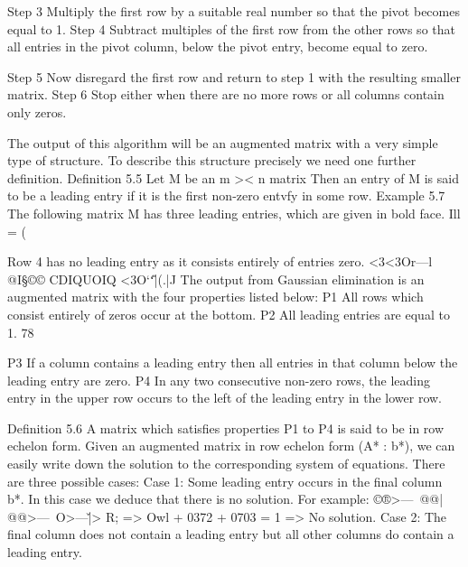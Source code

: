 \documentclass{beamer}
\begin{document}
\begin{frame}
Step 3 Multiply the ﬁrst row by a suitable real number so that
the pivot becomes equal to 1.
Step 4 Subtract multiples of the ﬁrst row from the other rows so
that all entries in the pivot column, below the pivot entry,
become equal to zero.

\end{frame}
\begin{frame}
Step 5 Now disregard the ﬁrst row and return to step 1 with the
resulting smaller matrix.
Step 6 Stop either when there are no more rows or all columns
contain only zeros.

\end{frame}
\begin{frame}
The output of this algorithm will be an augmented matrix with a
very simple type of structure. To describe this structure precisely we
need one further deﬁnition.
Definition 5.5 Let M be an m >< n matrix Then an entry of M is said to
be a leading entry if it is the first non-zero entvfy in some row.
Example 5.7 The following matrix M has three leading entries, which
are given in bold face.
Ill = (

\end{frame}
\begin{frame}
Row 4 has no leading entry as it consists entirely of entries zero.
<3<3Or—l
@I§©©
CDIQUOIQ
<3O‘\U‘|(.|J
The output from Gaussian elimination is an augmented matrix with
the four properties listed below:
P1 All rows which consist entirely of zeros occur at the bottom.
P2 All leading entries are equal to 1.
78



P3 If a column contains a leading entry then all entries in that
column below the leading entry are zero.
P4 In any two consecutive non-zero rows, the leading entry in the
upper row occurs to the left of the leading entry in the lower
row.

\end{frame}
\begin{frame}
Definition 5.6 A matrix which satisﬁes properties P1 to P4 is said to be
in row echelon form.
Given an augmented matrix in row echelon form (A* : b*), we can
easily write down the solution to the corresponding system of
equations. There are three possible cases:
Case 1: Some leading entry occurs in the final column b*.
In this case we deduce that there is no solution. For example:
©®>—\
@@|\)
@@>—\
O>—\v|>
R; => Owl + 0372 + 0703 = 1 => No solution.
Case 2: The ﬁnal column does not contain a leading entry but all
other columns do contain a leading entry.

\end{frame}
\end{document}
